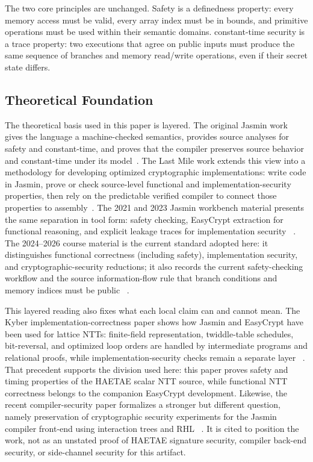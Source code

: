 \documentclass[10pt,twocolumn]{article}
\newcommand{\jasmin}{Jasmin}
\newcommand{\ct}{constant-time}
\begin{document}
The two core principles are unchanged.  Safety is a definedness property: every
memory access must be valid, every array index must be in bounds, and primitive
operations must be used within their semantic domains.  \ct{} security is a
trace property: two executions that agree on public inputs must produce the same
sequence of branches and memory read/write operations, even if their secret
state differs.

\subsection{Theoretical Foundation}

The theoretical basis used in this paper is layered.  The original \jasmin{}
work gives the language a machine-checked semantics, provides source analyses
for safety and \ct{}, and proves that the compiler preserves source behavior and
\ct{} under its model~\cite{Jasmin2017}.  The Last Mile work extends this
view into a methodology for developing optimized cryptographic implementations:
write code in \jasmin{}, prove or check source-level functional and
implementation-security properties, then rely on the predictable verified
compiler to connect those properties to assembly~\cite{LastMile2020}.  The
2021 and 2023 Jasmin workbench material presents the same separation in tool
form: safety checking, EasyCrypt extraction for functional reasoning, and
explicit leakage traces for implementation security
~\cite{JasminWorkshop2021,JasminWorkbench2023}.  The 2024--2026 course material
is the current standard adopted here: it distinguishes functional correctness
(including safety), implementation security, and cryptographic-security
reductions; it also records the current safety-checking workflow and the source
information-flow rule that branch conditions and memory indices must be public
~\cite{JasminCourse2024,JasminFramework2026}.

This layered reading also fixes what each local claim can and cannot mean.  The
Kyber implementation-correctness paper shows how Jasmin and EasyCrypt have been
used for lattice NTTs: finite-field representation, twiddle-table schedules,
bit-reversal, and optimized loop orders are handled by intermediate programs and
relational proofs, while implementation-security checks remain a separate layer
~\cite{KyberVerify2023}.  That precedent supports the division used here: this
paper proves safety and timing properties of the HAETAE scalar NTT source, while
functional NTT correctness belongs to the companion EasyCrypt development.
Likewise, the recent compiler-security paper formalizes a stronger but different
question, namely preservation of cryptographic security experiments for the
Jasmin compiler front-end using interaction trees and RHL
~\cite{ArranzOlmos2025JasminSecurity}.  It is cited to position the work, not as
an unstated proof of HAETAE signature security, compiler back-end security, or
side-channel security for this artifact.
\end{document}
